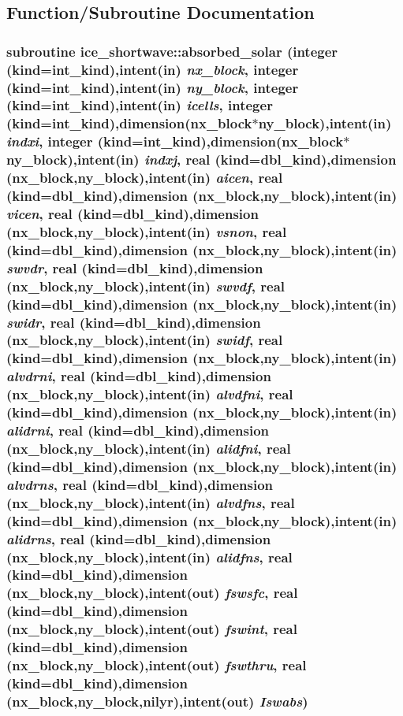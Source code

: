 \subsection{Function/Subroutine Documentation}
\hypertarget{namespaceice__shortwave_a8e3aa5ad4b562f1a00ecb4c6e024f1b1}{
\subsubsection[{absorbed\_\-solar}]{\setlength{\rightskip}{0pt plus 5cm}subroutine ice\_\-shortwave::absorbed\_\-solar (integer (kind=int\_\-kind),intent(in) {\em nx\_\-block}, \/  integer (kind=int\_\-kind),intent(in) {\em ny\_\-block}, \/  integer (kind=int\_\-kind),intent(in) {\em icells}, \/  integer (kind=int\_\-kind),dimension(nx\_\-block$\ast$ny\_\-block),intent(in) {\em indxi}, \/  integer (kind=int\_\-kind),dimension(nx\_\-block$\ast$ny\_\-block),intent(in) {\em indxj}, \/  real (kind=dbl\_\-kind),dimension (nx\_\-block,ny\_\-block),intent(in) {\em aicen}, \/  real (kind=dbl\_\-kind),dimension (nx\_\-block,ny\_\-block),intent(in) {\em vicen}, \/  real (kind=dbl\_\-kind),dimension (nx\_\-block,ny\_\-block),intent(in) {\em vsnon}, \/  real (kind=dbl\_\-kind),dimension (nx\_\-block,ny\_\-block),intent(in) {\em swvdr}, \/  real (kind=dbl\_\-kind),dimension (nx\_\-block,ny\_\-block),intent(in) {\em swvdf}, \/  real (kind=dbl\_\-kind),dimension (nx\_\-block,ny\_\-block),intent(in) {\em swidr}, \/  real (kind=dbl\_\-kind),dimension (nx\_\-block,ny\_\-block),intent(in) {\em swidf}, \/  real (kind=dbl\_\-kind),dimension (nx\_\-block,ny\_\-block),intent(in) {\em alvdrni}, \/  real (kind=dbl\_\-kind),dimension (nx\_\-block,ny\_\-block),intent(in) {\em alvdfni}, \/  real (kind=dbl\_\-kind),dimension (nx\_\-block,ny\_\-block),intent(in) {\em alidrni}, \/  real (kind=dbl\_\-kind),dimension (nx\_\-block,ny\_\-block),intent(in) {\em alidfni}, \/  real (kind=dbl\_\-kind),dimension (nx\_\-block,ny\_\-block),intent(in) {\em alvdrns}, \/  real (kind=dbl\_\-kind),dimension (nx\_\-block,ny\_\-block),intent(in) {\em alvdfns}, \/  real (kind=dbl\_\-kind),dimension (nx\_\-block,ny\_\-block),intent(in) {\em alidrns}, \/  real (kind=dbl\_\-kind),dimension (nx\_\-block,ny\_\-block),intent(in) {\em alidfns}, \/  real (kind=dbl\_\-kind),dimension (nx\_\-block,ny\_\-block),intent(out) {\em fswsfc}, \/  real (kind=dbl\_\-kind),dimension (nx\_\-block,ny\_\-block),intent(out) {\em fswint}, \/  real (kind=dbl\_\-kind),dimension (nx\_\-block,ny\_\-block),intent(out) {\em fswthru}, \/  real (kind=dbl\_\-kind),dimension (nx\_\-block,ny\_\-block,nilyr),intent(out) {\em Iswabs})}}
\label{namespaceice__shortwave_a8e3aa5ad4b562f1a00ecb4c6e024f1b1}


